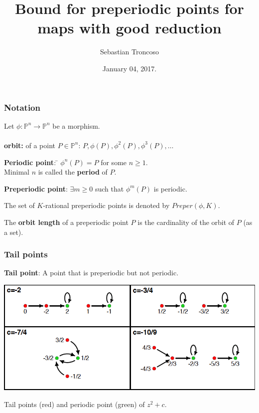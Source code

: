 \documentclass{beamer}
\title[Bounds for Preperiodic points]{Bound for preperiodic points for maps with good reduction}
\author[S. Troncoso]{Sebastian Troncoso}
\institute[MSU]{Michigsn State University}
\date[ January 04, 2017.]{ January 04, 2017. \\ \vspace{1cm} }
\newenvironment{nstabbing}
  {\setlength{\topsep}{0pt}%
   \setlength{\partopsep}{0pt}%
   \tabbing}
  {\endtabbing}
\def\PP{{\mathbb P}}
\theoremstyle{thmstyle}
\theoremstyle{mystyle}
\theoremstyle{qstnstyle}
\begin{document}
\begin{frame}
\titlepage
\end{frame}

\begin{frame}
\frametitle{Notation}
Let $\phi:\mathbb{P}^n\to\mathbb{P}^n$ be a morphism. \\\quad\\
 
\textbf{orbit:} of a point $P\in\PP^n$: \quad \(P, \phi(P),
\phi^2(P),\phi^3(P),\ldots\)
 
\begin{nstabbing}
\textbf{Periodic point}: \= $\phi^n(P)=P$ for some $n\geq{1}$. \\
\> Minimal $n$ is called the \textbf{period} of $P$.
\end{nstabbing}
 
\textbf{Preperiodic point}: $\exists m\geq{0}$ such that $\phi^m(P)$
is periodic.
 
\vspace{2mm}

The set of $K$-rational preperiodic points is denoted by $Preper(\phi,K)$.


 
The \textbf{orbit length} of a preperiodic point $P$ is the cardinality of the orbit of $P$ (as a set).
\end{frame}

\begin{frame}
\frametitle{Tail points}

\textbf{Tail point}: A point that is preperiodic but not periodic.%
  


\begin{center}
\includegraphics[width=1.0\linewidth]{placeholder4}
\end{center}

Tail points (red) and periodic point (green) of  $z^2+c$.
\end{frame}
\end{document}
